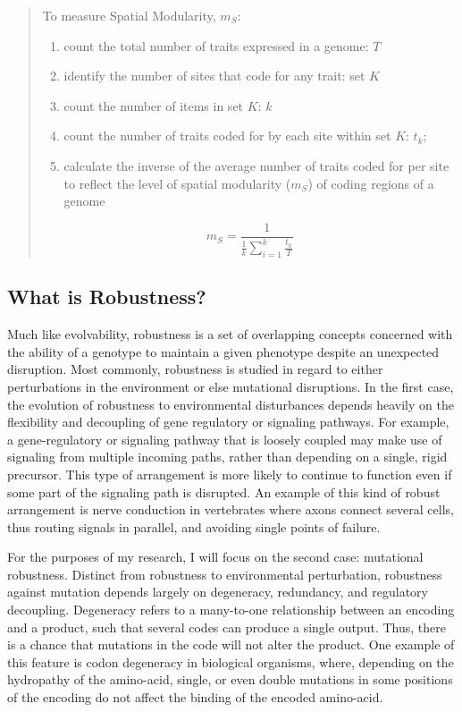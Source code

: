 \documentclass[PhD]{msu-thesis}
\begin{document}
\begin{quote}
To measure Spatial Modularity, $m_S$:

\begin{enumerate}
\item count the total number of traits expressed in a genome: $T$
\item identify the number of sites that code for any trait: set $K$
\item count the number of items in set $K$: $k$
\item count the number of traits coded for by each site within set $K$: $t_k$;
\item calculate the inverse of the average number of traits coded for per site to reflect the level of spatial modularity ($m_S$) of coding regions of a genome
\end{enumerate}
\begin{equation}
m_S = \frac{1}{\frac{1}{k} {\sum_{i=1}^{k} \frac{t_{k}}{T}}} 
\end{equation}
\end{quote}




\subsection{What is Robustness?}

Much like evolvability, robustness is a set of overlapping concepts concerned with the ability of a genotype to maintain a given phenotype despite an unexpected disruption\cite{kitano_biological_2004,visser_perspective:_2003}. Most commonly, robustness is studied in regard to either perturbations in the environment or else mutational disruptions. In the first case, the evolution of robustness to environmental disturbances depends heavily on the flexibility and decoupling of gene regulatory or signaling pathways\cite{kirschner_evolvability_1998}. For example, a gene-regulatory or signaling pathway that is loosely coupled may make use of signaling from multiple incoming paths, rather than depending on a single, rigid precursor. This type of arrangement is more likely to continue to function even if some part of the signaling path is disrupted. An example of this kind of robust arrangement is nerve conduction in vertebrates where axons connect several cells, thus routing signals in parallel, and avoiding single points of failure\cite{kirschner_evolvability_1998}.

For the purposes of my research, I will focus on the second case: mutational robustness. Distinct from robustness to environmental perturbation, robustness against mutation depends largely on degeneracy, redundancy, and regulatory decoupling\cite{kitano_biological_2004}. Degeneracy refers to a many-to-one relationship between an encoding and a product, such that several codes can produce a single output. Thus, there is a chance that mutations in the code will not alter the product. One example of this feature is codon degeneracy in biological organisms, where, depending on the hydropathy of the amino-acid, single, or even double mutations in some positions of the encoding do not affect the binding of the encoded amino-acid\cite{whitacre_degeneracy:_2010}.
\end{document}
